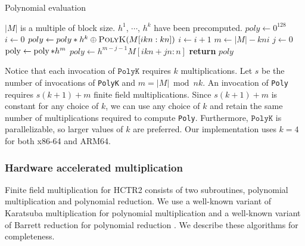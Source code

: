 \documentclass[hctr.tex]{subfiles}
\begin{document}
\begin{algorithm}[H]
\caption{Polynomial evaluation}\label{polyalg}
\begin{algorithmic}[1]
	\Require $|M|$ is a multiple of block size.
	\Require $h^1$, $\cdots$, $h^{k}$ have been precomputed.
		\State $poly \gets 0^{128}$
		\State $i \gets 0$
			\State $poly \gets poly*h^k \oplus \Call{PolyK}{M[ikn : kn]}$
			\State $i \gets i + 1$
		\EndWhile
		\State $m \gets |M| - kni$
		\State $j \gets 0$
		\State $\operatorname{poly} \gets \operatorname{poly}*h^m$
		\State $poly \gets h^{m-j-1}M[ikn + jn : n]$
		\EndWhile
		\State \textbf{return} $poly$
	\EndProcedure
\end{algorithmic}
\end{algorithm}
Notice that each invocation of $\texttt{PolyK}$ requires $k$ multiplications. Let $s$ be the number of invocations of \texttt{PolyK} and $m = |M| \bmod nk$. An invocation of \texttt{Poly} requires $s(k+1) + m$ finite field multiplications. Since $s(k+1) + m$ is constant for any choice of $k$, we can use any choice of $k$ and retain the same number of multiplications required to compute \texttt{Poly}. Furthermore, $\texttt{PolyK}$ is parallelizable, so larger values of $k$ are preferred. Our implementation uses $k = 4$ for both x86-64 and ARM64.

\subsubsection{Hardware accelerated multiplication}
Finite field multiplication for HCTR2 consists of two subroutines, polynomial multiplication and polynomial reduction. We use a well-known variant of Karatsuba multiplication for polynomial multiplication and a well-known variant of Barrett reduction for polynomial reduction \cite{CLMUL}. We describe these algorithms for completeness.
\end{document}
